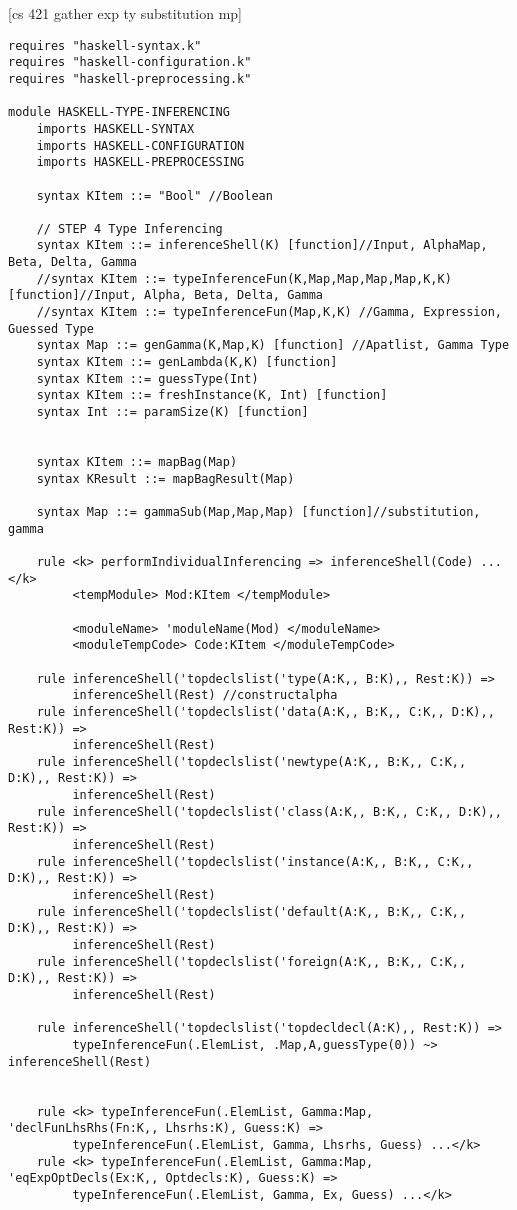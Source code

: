 [cs 421 gather exp ty substitution mp]

\begin{lstlisting}
requires "haskell-syntax.k"
requires "haskell-configuration.k"
requires "haskell-preprocessing.k"

module HASKELL-TYPE-INFERENCING
    imports HASKELL-SYNTAX
    imports HASKELL-CONFIGURATION
    imports HASKELL-PREPROCESSING

    syntax KItem ::= "Bool" //Boolean

    // STEP 4 Type Inferencing
    syntax KItem ::= inferenceShell(K) [function]//Input, AlphaMap, Beta, Delta, Gamma
    //syntax KItem ::= typeInferenceFun(K,Map,Map,Map,Map,K,K) [function]//Input, Alpha, Beta, Delta, Gamma
    //syntax KItem ::= typeInferenceFun(Map,K,K) //Gamma, Expression, Guessed Type
    syntax Map ::= genGamma(K,Map,K) [function] //Apatlist, Gamma Type
    syntax KItem ::= genLambda(K,K) [function]
    syntax KItem ::= guessType(Int)
    syntax KItem ::= freshInstance(K, Int) [function]
    syntax Int ::= paramSize(K) [function]


    syntax KItem ::= mapBag(Map)
    syntax KResult ::= mapBagResult(Map)

    syntax Map ::= gammaSub(Map,Map,Map) [function]//substitution, gamma

    rule <k> performIndividualInferencing => inferenceShell(Code) ...</k>
         <tempModule> Mod:KItem </tempModule>

         <moduleName> 'moduleName(Mod) </moduleName>
         <moduleTempCode> Code:KItem </moduleTempCode>

    rule inferenceShell('topdeclslist('type(A:K,, B:K),, Rest:K)) =>
         inferenceShell(Rest) //constructalpha
    rule inferenceShell('topdeclslist('data(A:K,, B:K,, C:K,, D:K),, Rest:K)) =>
         inferenceShell(Rest)
    rule inferenceShell('topdeclslist('newtype(A:K,, B:K,, C:K,, D:K),, Rest:K)) =>
         inferenceShell(Rest)
    rule inferenceShell('topdeclslist('class(A:K,, B:K,, C:K,, D:K),, Rest:K)) =>
         inferenceShell(Rest)
    rule inferenceShell('topdeclslist('instance(A:K,, B:K,, C:K,, D:K),, Rest:K)) =>
         inferenceShell(Rest)
    rule inferenceShell('topdeclslist('default(A:K,, B:K,, C:K,, D:K),, Rest:K)) =>
         inferenceShell(Rest)
    rule inferenceShell('topdeclslist('foreign(A:K,, B:K,, C:K,, D:K),, Rest:K)) =>
         inferenceShell(Rest)

    rule inferenceShell('topdeclslist('topdecldecl(A:K),, Rest:K)) =>
         typeInferenceFun(.ElemList, .Map,A,guessType(0)) ~> inferenceShell(Rest)


    rule <k> typeInferenceFun(.ElemList, Gamma:Map, 'declFunLhsRhs(Fn:K,, Lhsrhs:K), Guess:K) =>
         typeInferenceFun(.ElemList, Gamma, Lhsrhs, Guess) ...</k>
    rule <k> typeInferenceFun(.ElemList, Gamma:Map, 'eqExpOptDecls(Ex:K,, Optdecls:K), Guess:K) =>
         typeInferenceFun(.ElemList, Gamma, Ex, Guess) ...</k>
\end{lstlisting}

